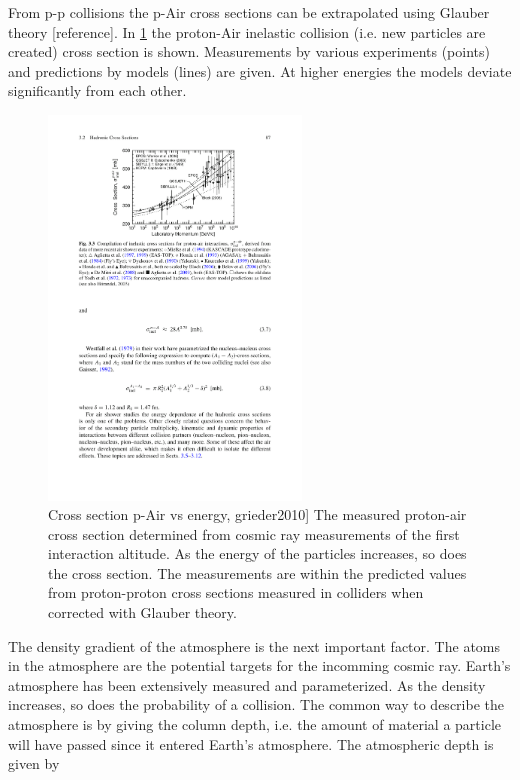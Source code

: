 From p-p collisions the p-Air cross sections can be extrapolated using Glauber theory [reference]. In \cref{fig:pair_crosssection} the proton-Air inelastic collision (i.e. new particles are created) cross section is shown. Measurements by various experiments (points) and predictions by models (lines) are given. At higher energies the models deviate significantly from each other.

\begin{figure}
    \centering
    \includegraphics[width=0.6\textwidth]
                    {plots/cosmic-rays/pair_crosssection}
    \caption{Cross section p-Air vs energy, grieder2010]
The measured proton-air cross section determined from cosmic ray measurements of the first interaction altitude. As the energy of the particles increases, so does the cross section. The measurements are within the predicted values from proton-proton cross sections measured in colliders when corrected with Glauber theory.}
    \label{fig:pair_crosssection}
\end{figure}


The density gradient of the atmosphere is the next important factor. The atoms in the atmosphere are the potential targets for the incomming cosmic ray. Earth's atmosphere has been extensively measured and parameterized. As the density increases, so does the probability of a collision. The common way to describe the atmosphere is by giving the column depth, i.e. the amount of material a particle will have passed since it entered Earth's atmosphere. The atmospheric depth is given by

